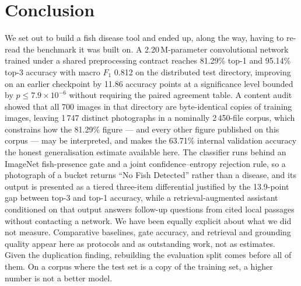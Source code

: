 \documentclass[conference]{IEEEtran}
\begin{document}
\section{Conclusion}

We set out to build a fish disease tool and ended up, along the way, having to re-read the benchmark it was built on. A 2.20\,M-parameter convolutional network trained under a shared preprocessing contract reaches 81.29\% top-1 and 95.14\% top-3 accuracy with macro $F_1$ 0.812 on the distributed test directory, improving on an earlier checkpoint by 11.86 accuracy points at a significance level bounded by $p\leq7.9\times10^{-6}$ without requiring the paired agreement table. A content audit showed that all 700 images in that directory are byte-identical copies of training images, leaving 1\,747 distinct photographs in a nominally 2\,450-file corpus, which constrains how the 81.29\% figure --- and every other figure published on this corpus --- may be interpreted, and makes the 63.71\% internal validation accuracy the honest generalisation estimate available here. The classifier runs behind an ImageNet fish-presence gate and a joint confidence--entropy rejection rule, so a photograph of a bucket returns ``No Fish Detected'' rather than a disease, and its output is presented as a tiered three-item differential justified by the 13.9-point gap between top-3 and top-1 accuracy, while a retrieval-augmented assistant conditioned on that output answers follow-up questions from cited local passages without contacting a network. We have been equally explicit about what we did not measure. Comparative baselines, gate accuracy, and retrieval and grounding quality appear here as protocols and as outstanding work, not as estimates. Given the duplication finding, rebuilding the evaluation split comes before all of them. On a corpus where the test set is a copy of the training set, a higher number is not a better model.



\end{document}
